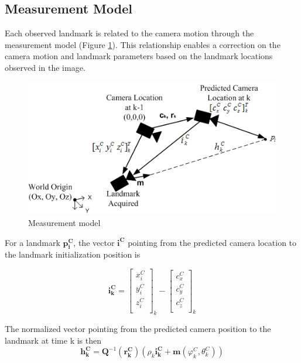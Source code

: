 \subsection{Measurement Model}

Each observed landmark is related to the camera motion through the
measurement model (Figure \ref{fig:measurement_model}). This
relationship enables a correction on the camera motion and landmark
parameters based on the landmark locations observed in the image.

\begin{figure}[h]
\centering
\includegraphics[width=12cm, keepaspectratio=true]{./Figures/measurement_model.jpg}
\caption{Measurement model}
\label{fig:measurement_model}
\end{figure}
\FloatBarrier
For a landmark $\boldsymbol{p_{i}^{C}}$, the vector $\boldsymbol{i^{C}}$
pointing from the predicted camera location to the landmark
initialization position is

\begin{equation}
\boldsymbol{i_{k}^{C}}=\begin{bmatrix}
x_{i}^{C} \\
y_{i}^{C} \\
z_{i}^{C} \\
\end{bmatrix}_{k}-\begin{bmatrix}
c_{x}^{C} \\
c_{y}^{C} \\
c_{z}^{C} \\
\end{bmatrix}_{k}
\end{equation}

The normalized vector pointing from the predicted camera position to the 
landmark at time k is then 
\begin{equation}
  \boldsymbol{h_{k}^{C}}=\boldsymbol{Q}^{-1}\left(\boldsymbol{r_{k}^{C}}\right)
  \left(\rho_{k}\boldsymbol{i_{k}^{C}}+
    \boldsymbol{m}\left(\varphi_k^{C},\theta _{k}^{C}\right)\right)
\end{equation}

